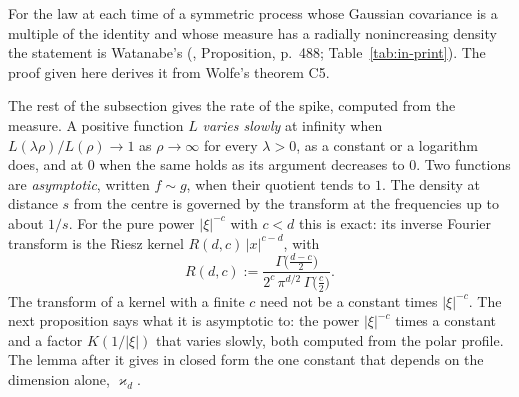 For the law at each time of a symmetric \Levy{} process whose Gaussian covariance is a multiple
of the identity and whose \Levy{} measure has a radially
nonincreasing density the statement is Watanabe's (,
Proposition, p.~488; Table~\ref{tab:in-print}). The proof given here derives it from Wolfe's
theorem C5.

The rest of the subsection gives the rate of the spike, computed from the \Levy{} measure. A
positive function $L$ \emph{varies slowly}
at infinity when $L(\lambda\rho)/L(\rho) \to 1$ as $\rho \to \infty$ for every $\lambda > 0$, as
a constant or a logarithm does, and at $0$ when the same holds as its argument decreases to
$0$. Two functions are \emph{asymptotic}, written $f \sim g$, when their quotient tends to $1$.
The density at distance $s$ from the centre is governed by the transform at the frequencies up
to about $1/s$. For the pure power $|\xi|^{-c}$ with $c < d$ this is exact: its inverse Fourier
transform is the Riesz kernel $R(d,c)\,|x|^{c-d}$, with
\[
  R(d,c) := \frac{\Gamma\bigl(\tfrac{d-c}{2}\bigr)}{2^{c}\,\pi^{d/2}\,\Gamma\bigl(\tfrac c2\bigr)} .
\]
The transform of a kernel with a finite $c$ need not be a constant times $|\xi|^{-c}$. The next
proposition says what it is asymptotic to: the power $|\xi|^{-c}$ times a constant and a factor $K(1/|\xi|)$
that varies slowly, both computed from the polar profile. The lemma after it gives in closed
form the one constant that depends on the dimension alone, $\varkappa_d$.

